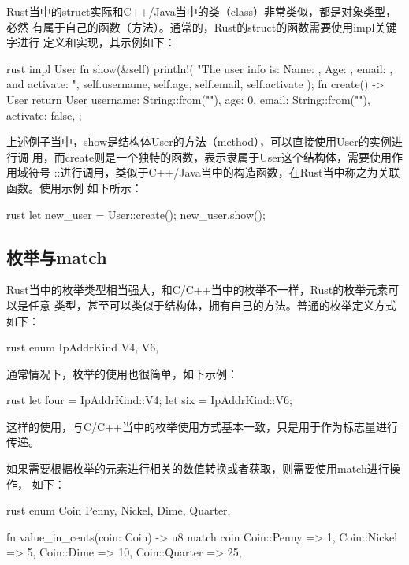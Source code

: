 Rust当中的struct实际和C++/Java当中的类（class）非常类似，都是对象类型，必然
有属于自己的函数（方法）。通常的，Rust的struct的函数需要使用impl关键字进行
定义和实现，其示例如下：
\begin{code-block}{rust}
impl User {
    fn show(&self) {
        println!(
            "The user info is: Name: {}, Age: {}, email: {}, and activate: {}",
            self.username, self.age, self.email, self.activate
        );
    }
    fn create() -> User {
        return User {
            username: String::from(""),
            age: 0,
            email: String::from(""),
            activate: false,
        };
    }
}
\end{code-block}
上述例子当中，show是结构体User的方法（method），可以直接使用User的实例进行调
用，而create则是一个独特的函数，表示隶属于User这个结构体，需要使用作用域符号
::进行调用，类似于C++/Java当中的构造函数，在Rust当中称之为关联函数。使用示例
如下所示：
\begin{code-block}{rust}
let new_user = User::create();
new_user.show();
\end{code-block}

\subsection{枚举与match}
Rust当中的枚举类型相当强大，和C/C++当中的枚举不一样，Rust的枚举元素可以是任意
类型，甚至可以类似于结构体，拥有自己的方法。普通的枚举定义方式如下：
\begin{code-block}{rust}
enum IpAddrKind {
    V4,
    V6,
}
\end{code-block}
通常情况下，枚举的使用也很简单，如下示例：
\begin{code-block}{rust}
let four = IpAddrKind::V4;
let six = IpAddrKind::V6;
\end{code-block}
这样的使用，与C/C++当中的枚举使用方式基本一致，只是用于作为标志量进行传递。

如果需要根据枚举的元素进行相关的数值转换或者获取，则需要使用match进行操作，
如下：
\begin{code-block}{rust}
enum Coin {
    Penny,
    Nickel,
    Dime,
    Quarter,
}

fn value_in_cents(coin: Coin) -> u8 {
    match coin {
        Coin::Penny => 1,
        Coin::Nickel => 5,
        Coin::Dime => 10,
        Coin::Quarter => 25,
    }
}
\end{code-block}


